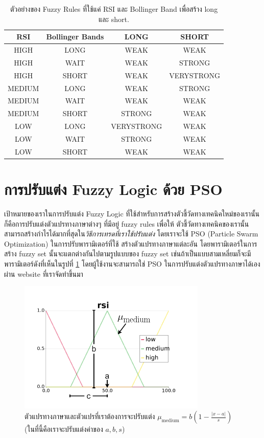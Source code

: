 \begin{table}[htp]
	\centering
	\begin{tabular}{c c c c}
		\toprule
        {RSI} & {Bollinger Bands} & {LONG} & {SHORT} \\ 
        \midrule
        HIGH & LONG & WEAK & WEAK \\
        HIGH & WAIT & WEAK & STRONG \\
        HIGH & SHORT & WEAK & VERYSTRONG \\
        MEDIUM & LONG & WEAK & STRONG \\
        MEDIUM & WAIT & WEAK & WEAK \\
        MEDIUM & SHORT & STRONG & WEAK \\
        LOW & LONG & VERYSTRONG & WEAK \\
        LOW & WAIT & STRONG & WEAK \\
        LOW & SHORT & WEAK & WEAK \\
        \bottomrule
    \end{tabular} 
    \caption{ตัวอย่างของ Fuzzy Rules ที่ใช้แค่ RSI และ Bollinger Band เพื่อสร้าง long และ short.}
	\label{table:1}
\end{table}
\FloatBarrier

\section{การปรับแต่ง Fuzzy Logic ด้วย PSO}
เป้าหมายของเราในการปรับแต่ง Fuzzy Logic ที่ใช้สำหรับการสร้างตัวชี้วัดทางเทคนิคใหม่ของเรานั้น ก็คือการปรับแต่งตัวแปรทางภาษาต่างๆ ที่มีอยู่ fuzzy rules เพื่อให้
ตัวชี้วัดทางเทคนิคของเรานั้นสามารถสร้างกำไรได้มากที่สุดใน\emph{วิธีการเทรดที่เราใช้ปรับแต่ง} โดยเราจะใช้ PSO (Particle Swarm Optimization) ในการปรับพารามิเตอร์ที่ใช้
สร้างตัวแปรทางภาษาแต่ละอัน โดยพารามิเตอร์ในการสร้าง fuzzy set นั้นจะแตกต่างกันไปตามรูปแบบของ fuzzy set 
เช่นถ้าเป็นแบบสามเหลี่ยมก็จะมีพารามิเตอร์ดังที่เห็นในรูปที่ \ref{fig:9} โดยผู้ใช้งานจะสามารถใช่ PSO ในการปรับแต่งตัวแปรทางภาษาได้เองผ่าน website ที่เราจัดทำขึ้นมา

\begin{figure}[ht]
    \centering
    \includegraphics[width=0.8\textwidth]{images/linguisticv.png}
    \caption{ตัวแปรทางภาษาและตัวแปรที่เราต้องการจะปรับแต่ง $\mu_{\text{medium}} = b (1 - \frac{ |x-a| }{s})$ (ในที่นี้คือเราจะปรับแต่งค่าของ $a, b, s$)}
    \label{fig:9}
\end{figure}

